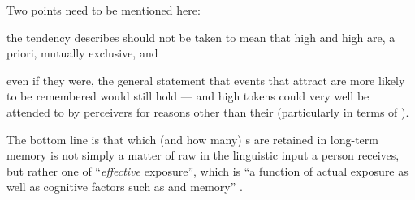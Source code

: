 Two points need to be mentioned here:
\begin{inparaenum}[(1)]
	\item the tendency \citeauthor{pierrehumbert2006} describes should not be taken to mean that high  and high  are, a priori, mutually exclusive, and
	\item even if they were, the general statement that events that attract  are more likely to be remembered would still hold --- and high  tokens could very well be attended to by perceivers for reasons other than their  (particularly in terms of ).
\end{inparaenum}
The bottom line is that which (and how many) s are retained in long-term memory is not simply a matter of raw  in the linguistic input a person receives, but rather one of ``\emph{effective} exposure'', which is ``a function of actual exposure as well as cognitive factors such as  and memory'' \parencite[519, my emphasis]{pierrehumbert2006}.


